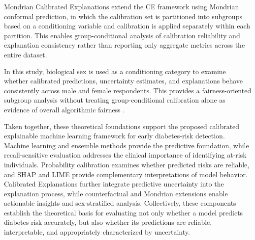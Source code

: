Mondrian Calibrated Explanations extend the CE framework using Mondrian
conformal prediction, in which the calibration set is partitioned into
subgroups based on a conditioning variable and calibration is applied
separately within each partition. This enables group-conditional analysis
of calibration reliability and explanation consistency rather than reporting
only aggregate metrics across the entire dataset.

In this study, biological sex is used as a conditioning category to examine
whether calibrated predictions, uncertainty estimates, and explanations
behave consistently across male and female respondents. This provides a
fairness-oriented subgroup analysis without treating group-conditional
calibration alone as evidence of overall algorithmic fairness
\cite{lofstrom_conditional_ce_2024}.

Taken together, these theoretical foundations support the proposed
calibrated explainable machine learning framework for early diabetes-risk
detection. Machine learning and ensemble methods provide the predictive
foundation, while recall-sensitive evaluation addresses the clinical
importance of identifying at-risk individuals. Probability calibration
examines whether predicted risks are reliable, and SHAP and LIME provide
complementary interpretations of model behavior. Calibrated Explanations
further integrate predictive uncertainty into the explanation process, while
counterfactual and Mondrian extensions enable actionable insights and
sex-stratified analysis. Collectively, these components establish the
theoretical basis for evaluating not only whether a model predicts diabetes
risk accurately, but also whether its predictions are reliable,
interpretable, and appropriately characterized by uncertainty.

